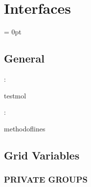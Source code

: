 
\section{Interfaces} 


\parskip = 0pt

\vspace{3mm} \subsection*{General}

: 

testmol
\vspace{2mm}

: 

methodoflines
\vspace{2mm}
\subsection*{Grid Variables}
\vspace{5mm}\subsubsection{PRIVATE GROUPS}

\vspace{5mm}


